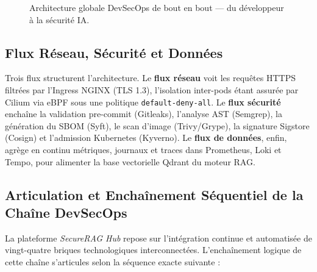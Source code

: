 \begin{figure}[H]
{
}
\caption{Architecture globale DevSecOps de bout en bout — du développeur à la sécurité IA.}
\label{fig:pipeline_global_devsecops}
\end{figure}

\subsection{Flux Réseau, Sécurité et Données}

Trois flux structurent l'architecture. Le \textbf{flux réseau} voit les requêtes HTTPS filtrées par l'Ingress NGINX (TLS 1.3), l'isolation inter-pods étant assurée par Cilium via eBPF sous une politique \texttt{default-deny-all}. Le \textbf{flux sécurité} enchaîne la validation pre-commit (Gitleaks), l'analyse AST (Semgrep), la génération du SBOM (Syft), le scan d'image (Trivy/Grype), la signature Sigstore (Cosign) et l'admission Kubernetes (Kyverno). Le \textbf{flux de données}, enfin, agrège en continu métriques, journaux et traces dans Prometheus, Loki et Tempo, pour alimenter la base vectorielle Qdrant du moteur RAG.

\subsection{Articulation et Enchaînement Séquentiel de la Chaîne DevSecOps}
\label{subsec:articulation_chaine_devsecops}

La plateforme \textit{SecureRAG Hub} repose sur l'intégration continue et automatisée de vingt-quatre briques technologiques interconnectées. L'enchaînement logique de cette chaîne s'articules selon la séquence exacte suivante :


